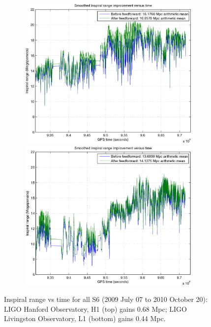 \begin{figure}
\begin{center}
\includegraphics[height=75mm, width=150mm]{plots/fullAMPS/clip-range-LHO-new.eps}
\includegraphics[height=75mm, width=150mm]{plots/fullAMPS/clip-range-LLO-new.eps}
\caption{Inspiral range vs time for all S6 (2009 July 07 to 2010 October 20):
LIGO Hanford Observatory, H1 (top) gains 0.68 Mpc; LIGO Livingston Observatory, L1 (bottom) gains 0.44 Mpc.}
\label{S6inspiralRangeFull}
\end{center}
\end{figure}

